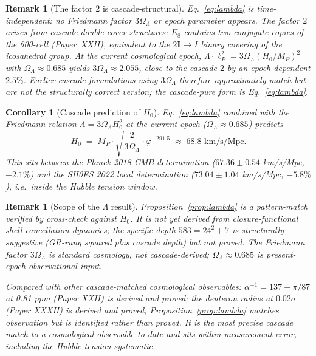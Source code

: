 \documentclass[12pt]{article}
\newtheorem{corollary}[theorem]{Corollary}
\newtheorem{remark}[theorem]{Remark}
\newcommand{\twoI}{2\mathbf{I}}
\begin{document}
\begin{remark}[The factor $2$ is cascade-structural]\label{rmk:lambda-factor-2}
Eq.~\ref{eq:lambda} is time-independent: no Friedmann factor $3 \Omega_\Lambda$ or epoch parameter appears. The factor $2$ arises from cascade double-cover structures: $E_8$ contains two conjugate copies of the 600-cell (Paper~XXII), equivalent to the $\twoI \to I$ binary covering of the icosahedral group. At the current cosmological epoch, $\Lambda \cdot \ell_P^2 = 3 \Omega_\Lambda (H_0 / M_P)^2$ with $\Omega_\Lambda \approx 0.685$ yields $3 \Omega_\Lambda \approx 2.055$, close to the cascade $2$ by an epoch-dependent $2.5\%$. Earlier cascade formulations using $3 \Omega_\Lambda$ therefore approximately match but are not the structurally correct version; the cascade-pure form is Eq.~\ref{eq:lambda}.
\end{remark}

\begin{corollary}[Cascade prediction of $H_0$]\label{cor:H0}
Eq.~\ref{eq:lambda} combined with the Friedmann relation $\Lambda = 3 \Omega_\Lambda H_0^2$ at the current epoch ($\Omega_\Lambda \approx 0.685$) predicts
\[
    H_0 \;=\; M_P \cdot \sqrt{\frac{2}{3 \Omega_\Lambda}} \cdot \varphi^{-291.5} \;\approx\; 68.8 \text{ km/s/Mpc}.
\]
This sits between the Planck 2018 CMB determination ($67.36 \pm 0.54$ km/s/Mpc, $+2.1\%$) and the SH0ES 2022 local determination ($73.04 \pm 1.04$ km/s/Mpc, $-5.8\%$), i.e.\ inside the Hubble tension window.
\end{corollary}

\begin{remark}[Scope of the $\Lambda$ result]\label{rmk:lambda-scope}
Proposition~\ref{prop:lambda} is a pattern-match verified by cross-check against $H_0$. It is not yet derived from closure-functional shell-cancellation dynamics; the specific depth $583 = 24^2 + 7$ is structurally suggestive (GR-rung squared plus cascade depth) but not proved. The Friedmann factor $3\Omega_\Lambda$ is standard cosmology, not cascade-derived; $\Omega_\Lambda \approx 0.685$ is present-epoch observational input.

Compared with other cascade-matched cosmological observables: $\alpha^{-1} = 137 + \pi/87$ at 0.81 ppm (Paper XXII) is derived and proved; the deuteron radius at $0.02\sigma$ (Paper XXXII) is derived and proved; Proposition~\ref{prop:lambda} matches observation but is identified rather than proved. It is the most precise cascade match to a cosmological observable to date and sits within measurement error, including the Hubble tension systematic.
\end{remark}
\end{document}
